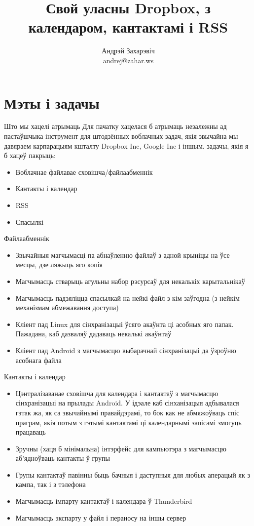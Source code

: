 \documentclass[ignorenonframetext,hyperref={pdftex,unicode}]{beamer}
\title{Свой уласны Dropbox, з календаром, кантактамі і RSS}
\author[Андрэй Захарэвіч]{Андрэй Захарэвіч\\ andrej@zahar.ws}
\begin{document}
\frame{\titlepage} 


\section{Мэты і задачы} 

\begin{frame}{Што мы хацелі атрымаць} 
	Для пачатку хацелася б атрымаць незалежны ад пастаўшчыка інструмент для штодзённых воблачных задач, якія звычайна мы давяраем карпарацыям кшталту Dropbox Inc, Google Inc і іншым.  задачы, якія я б хацеў пакрыць:
	\begin{itemize}
		\item Воблачнае файлавае сховішча/файлаабменнік
		\item Кантакты і календар
		\item RSS
		\item Спасылкі
	\end{itemize}
\end{frame}

\begin{frame}{Файлаабменнік}
	\begin{itemize}
		\item Звычайныя магчымасці па абнаўленню файлаў з адной крыніцы на ўсе месцы, дзе ляжыць яго копія
		\item Магчымасць стварыць агульны набор рэсурсаў для некалькіх карытальнікаў
		\item Магчымасць падзяліцца спасылкай на нейкі файл з кім заўгодна (з нейкім механізмам абмежавання доступа)
		\item Кліент пад Linux для сінхранізацыі ўсяго акаўнта ці асобных яго папак. Пажадана, каб дазваляў дадаваць некалькі акаўнтаў
		\item Кліент пад Android з магчымасцю выбарачнай сінхранізацыі да ўзроўню асобнага файла
	\end{itemize}
\end{frame}

\begin{frame}{Кантакты і календар}
	\begin{itemize}
		\item Цэнтралізаванае сховішча для календара і кантактаў з магчымасцю сінхранізацыі на прылады Android. У ідэале каб сінханізацыя адбывалася гэтак жа, як са звычайнымі правайдэрамі, то бок как не абмяжоўваць спіс праграм, якія потым з гэтымі кантактамі ці календарнымі запісамі змогуць працаваць
		\item Зручны (хаця б мінімальна) інтэрфейс для кампьютэра з магчымасцю аб’ядноўваць кантакты ў групы
		\item Групы кантактаў павінны быць бачныя і даступныя для любых аперацый як з кампа, так і з тэлефона
		\item Магчымасць імпарту кантактаў і календара ў Thunderbird
		\item Магчымасць экспарту у файл і пераносу на іншы сервер
	\end{itemize}
\end{frame}
\end{document}
